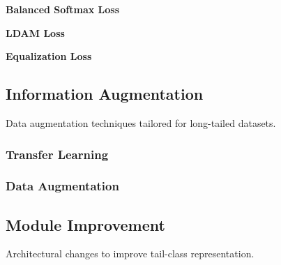 \myindent \textbf{Balanced Softmax Loss}

\myindent \textbf{LDAM Loss}

\myindent \textbf{Equalization Loss}


\subsection{Information Augmentation}
Data augmentation techniques tailored for long-tailed datasets.

\subsubsection{Transfer Learning}

\subsubsection{Data Augmentation}



\subsection{Module Improvement}
Architectural changes to improve tail-class representation.